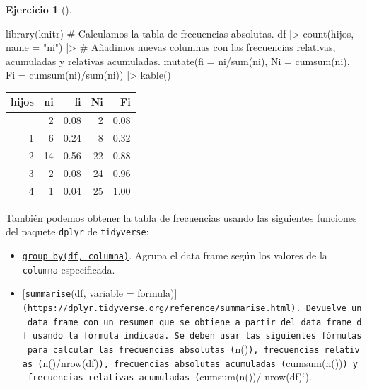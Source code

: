 \documentclass[
  a4paper,
]{scrreport}
\newenvironment{Shaded}{\begin{snugshade}}{\end{snugshade}}
\newcommand{\AttributeTok}[1]{\textcolor[rgb]{0.40,0.45,0.13}{#1}}
\newcommand{\CommentTok}[1]{\textcolor[rgb]{0.37,0.37,0.37}{#1}}
\newcommand{\FunctionTok}[1]{\textcolor[rgb]{0.28,0.35,0.67}{#1}}
\newcommand{\NormalTok}[1]{\textcolor[rgb]{0.00,0.23,0.31}{#1}}
\newcommand{\SpecialCharTok}[1]{\textcolor[rgb]{0.37,0.37,0.37}{#1}}
\newcommand{\StringTok}[1]{\textcolor[rgb]{0.13,0.47,0.30}{#1}}
\theoremstyle{definition}
\newtheorem{exercise}{Ejercicio}[chapter]
\theoremstyle{remark}
\begin{document}
\begin{exercise}[]
\begin{enumerate}
\begin{tcolorbox}
\begin{Shaded}
\begin{Highlighting}[]
\FunctionTok{library}\NormalTok{(knitr)}
\CommentTok{\# Calculamos la tabla de frecuencias absolutas.}
\NormalTok{df }\SpecialCharTok{|\textgreater{}} \FunctionTok{count}\NormalTok{(hijos, }\AttributeTok{name =} \StringTok{"ni"}\NormalTok{) }\SpecialCharTok{|\textgreater{}}
    \CommentTok{\# Añadimos nuevas columnas con las frecuencias relativas, acumuladas y relativas acumuladas.}
    \FunctionTok{mutate}\NormalTok{(}\AttributeTok{fi =}\NormalTok{ ni}\SpecialCharTok{/}\FunctionTok{sum}\NormalTok{(ni), }\AttributeTok{Ni =} \FunctionTok{cumsum}\NormalTok{(ni), }\AttributeTok{Fi =} \FunctionTok{cumsum}\NormalTok{(ni)}\SpecialCharTok{/}\FunctionTok{sum}\NormalTok{(ni)) }\SpecialCharTok{|\textgreater{}}
    \FunctionTok{kable}\NormalTok{()}
\end{Highlighting}
\end{Shaded}

  \begin{longtable}[]{@{}rrrrr@{}}
  \toprule\noalign{}
  hijos & ni & fi & Ni & Fi \\
  \midrule\noalign{}
  \endhead
  \bottomrule\noalign{}
  \endlastfoot
  0 & 2 & 0.08 & 2 & 0.08 \\
  1 & 6 & 0.24 & 8 & 0.32 \\
  2 & 14 & 0.56 & 22 & 0.88 \\
  3 & 2 & 0.08 & 24 & 0.96 \\
  4 & 1 & 0.04 & 25 & 1.00 \\
  \end{longtable}

  También podemos obtener la tabla de frecuencias usando las siguientes
  funciones del paquete \texttt{dplyr} de \texttt{tidyverse}:

  \begin{itemize}
  \item
    \href{https://dplyr.tidyverse.org/reference/group_by.html}{\texttt{group\_by(df,\ columna)}}.
    Agrupa el data frame según los valores de la \texttt{columna}
    especificada.
  \item
    {[}\texttt{summarise}(df, variable =
    formula){]}\texttt{(https://dplyr.tidyverse.org/reference/summarise.html).\ Devuelve\ un\ data\ frame\ con\ un\ resumen\ que\ se\ obtiene\ a\ partir\ del\ data\ frame\ df\ usando\ la\ fórmula\ indicada.\ Se\ deben\ usar\ las\ siguientes\ fórmulas\ para\ calcular\ las\ frecuencias\ absolutas\ (}n()\texttt{),\ frecuencias\ relativas\ (}n()/nrow(df)\texttt{),\ frecuencias\ absolutas\ acumuladas\ (}cumsum(n())\texttt{)\ y\ frecuencias\ relativas\ acumuladas\ (}cumsum(n())/
    nrow(df)`).
  \end{itemize}


\end{tcolorbox}
\end{enumerate}
\end{exercise}
\end{document}

